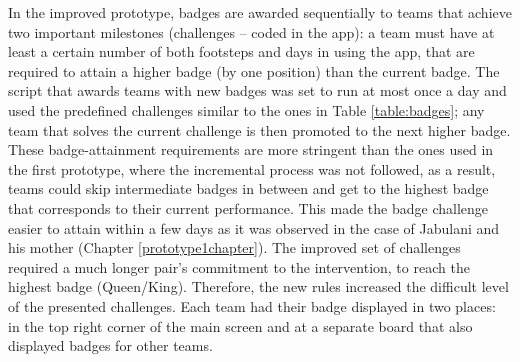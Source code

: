 In the improved prototype, badges are awarded sequentially to teams that achieve two important milestones (challenges -- coded in the app): a team must have at least a certain number of both footsteps and days in using the app, that are required to attain a higher badge (by one position) than the current badge. The script that awards teams with new badges was set to run at most once a day and used the predefined challenges similar to the ones in Table \ref{table:badges}; any team that solves the current challenge is then promoted to the next higher badge. These badge-attainment requirements are more stringent than the ones used in the first prototype, where the incremental process was not followed, as a result, teams could skip intermediate badges in between and get to the highest badge that corresponds to their current performance. This made the badge challenge easier to attain within a few days as it was observed in the case of Jabulani and his mother (Chapter \ref{prototype1chapter}). The improved set of challenges required a much longer pair's commitment to the intervention, to reach the highest badge (Queen/King). Therefore, the new rules increased the difficult level of the presented challenges. Each team had their badge displayed in two places: in the top right corner of the main screen and at a separate board that also displayed badges for other teams.
